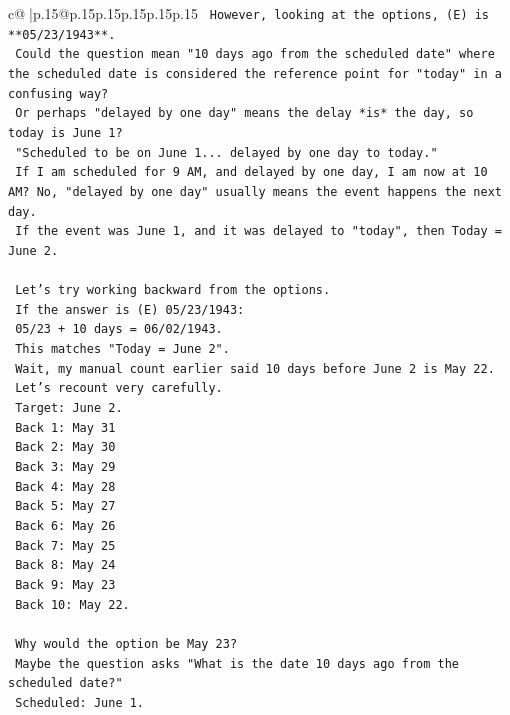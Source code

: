 \documentclass{article}
\begin{document}
{\begin{supertabular}{c@{$\;$}|p{.15\linewidth}@{}p{.15\linewidth}p{.15\linewidth}p{.15\linewidth}p{.15\linewidth}p{.15\linewidth}}
{{{\texttt{    However, looking at the options, (E) is **05/23/1943**.} \\
\texttt{    Could the question mean "10 days ago from the scheduled date" where the scheduled date is considered the reference point for "today" in a confusing way?} \\
\texttt{    Or perhaps "delayed by one day" means the delay *is* the day, so today is June 1?} \\
\texttt{    "Scheduled to be on June 1... delayed by one day to today."} \\
\texttt{    If I am scheduled for 9 AM, and delayed by one day, I am now at 10 AM? No, "delayed by one day" usually means the event happens the next day.} \\
\texttt{    If the event was June 1, and it was delayed to "today", then Today = June 2.} \\
\\ 
\texttt{    Let's try working backward from the options.} \\
\texttt{    If the answer is (E) 05/23/1943:} \\
\texttt{    05/23 + 10 days = 06/02/1943.} \\
\texttt{    This matches "Today = June 2".} \\
\texttt{    Wait, my manual count earlier said 10 days before June 2 is May 22.} \\
\texttt{    Let's recount very carefully.} \\
\texttt{    Target: June 2.} \\
\texttt{    Back 1: May 31} \\
\texttt{    Back 2: May 30} \\
\texttt{    Back 3: May 29} \\
\texttt{    Back 4: May 28} \\
\texttt{    Back 5: May 27} \\
\texttt{    Back 6: May 26} \\
\texttt{    Back 7: May 25} \\
\texttt{    Back 8: May 24} \\
\texttt{    Back 9: May 23} \\
\texttt{    Back 10: May 22.} \\
\\ 
\texttt{    Why would the option be May 23?} \\
\texttt{    Maybe the question asks "What is the date 10 days ago from the scheduled date?"} \\
\texttt{    Scheduled: June 1.} \\
}}}
\end{supertabular}}
\end{document}
